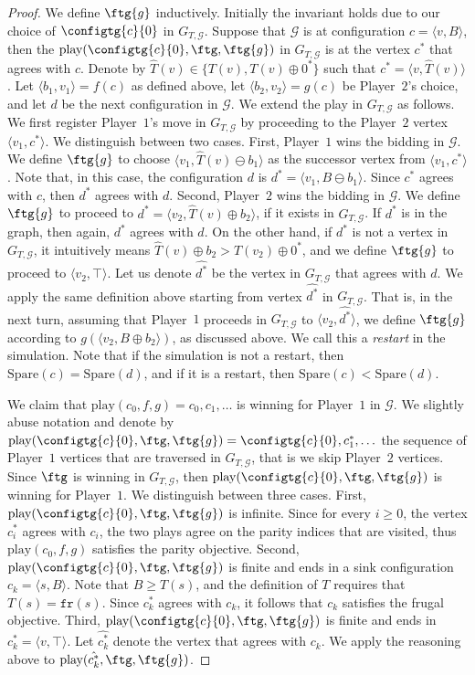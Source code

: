 \documentclass{article}\providecommand{\nequiv}{\not\equiv}\usepackage[a4paper,margin=20mm]{geometry}
\newcommand{\PO}{Player~$1$\xspace}
\newcommand{\PT}{Player~$2$\xspace}
\newcommand{\G}{{\mathcal G}}
\newcommand{\fr}{\texttt{fr}}
\newcommand{\play}{\text{play}\xspace}
\newcommand{\Spare}{\text{Spare}\xspace}
\newcommand{\zug}[1]{\langle #1  \rangle}
\newcommand{\succb}[1]{#1 \oplus 0^*\xspace}
\newcommand{\placeholdr}{\hat{T}(v)}
\begin{document}
\begin{proof}
	We define \(\ftg{g}\) inductively. 
Initially the invariant holds due to our choice of \(\configtg{c}{0}\) in \(G_{T, \G}\). 
	Suppose that \(\G\) is at configuration \(c = \zug{v, B}\), then the \(\play(\configtg{c}{0}, \ftg, \ftg{g})\) in  \(G_{T, \G}\) is at the vertex \(c^*\) that agrees with \(c\). 
	Denote by \(\placeholdr \in \{T(v), \succb{T(v)}\}\) such that \(c^* = \zug{v, \placeholdr}\). 
	Let \(\zug{b_1, v_1} = f(c)\) as defined above, let \(\zug{b_2, v_2} = g(c)\) be \PT's choice, and let \(d\) be the next configuration in $\G$. We extend the play in $G_{T,\G}$ as follows. 
	We first register \PO's move in \(G_{T, \G}\) by proceeding to the \PT vertex \(\zug{v_1, c^*}\). 
	We distinguish between two cases. First, \PO wins the bidding in $\G$. We define \(\ftg{g}\) to choose \(\zug{v_1, \placeholdr \ominus b_1}\) as the successor vertex from \(\zug{v_1, c^*}\). 
	Note that, in this case, the configuration \(d\) is \(d^* = \zug{v_1, B \ominus b_1}\).  
	Since \(c^*\) agrees with \(c\), then \(d^*\) agrees with \(d\). 
	Second, \PT wins the bidding in $\G$. We define \(\ftg{g}\) to proceed to \(d^* = \zug{v_2, \placeholdr \oplus b_2}\), if it exists in \(G_{T, \G}\). 
	If \(d^*\) is in the graph, then again, $d^*$ agrees with $d$. 
	On the other hand, if \(d^*\) is not a vertex in \(G_{T, \G}\), it intuitively means \(\placeholdr \oplus b_2 > \succb{T(v_2)}\), and we define \(\ftg{g}\) to proceed to \(\zug{v_2, \top}\). 
	Let us denote \(\hat{d^*}\) be the vertex in \(G_{T, \G}\) that agrees with \(d\). 
	We apply the same definition above starting from vertex \(\hat{d^*}\) in \(G_{T, \G}\). 
	That is, in the next turn, assuming that \PO proceeds in \(G_{T, \G}\) to \(\zug{v_2, \hat{d^*}}\), we define \(\ftg{g}\) according to \(g(\zug{v_2, B \oplus b_2})\), as discussed above. 
	We call this a \emph{restart} in the simulation. 
	Note that if the simulation is not a restart, then \(\Spare(c) = \Spare(d)\), and if it is a restart, then \(\Spare(c) < \Spare(d)\). 
	
	We claim that $\play(c_0, f, g) = c_0, c_1,\ldots$ is winning for \PO in $\G$. We slightly abuse notation and denote by $\play(\configtg{c}{0}, \ftg, \ftg{g}) = \configtg{c}{0}, c^*_1,\ldots$ the sequence of \PO vertices that are traversed in $G_{T, \G}$, that is we skip \PT vertices. 
	Since $\ftg$ is winning in $G_{T, \G}$, then $\play(\configtg{c}{0}, \ftg, \ftg{g})$ is winning for \PO. We distinguish between three cases. 
	First, $\play(\configtg{c}{0}, \ftg, \ftg{g})$ is infinite. Since for every $i \geq 0$, the vertex $c^*_i$ agrees with $c_i$, the two plays agree on the parity indices that are visited, thus $\play(c_0, f, g)$ satisfies the parity objective. 
	Second, $\play(\configtg{c}{0}, \ftg, \ftg{g})$ is finite and ends in a sink configuration $c_k = \zug{s, B}$. Note that $B \geq T(s)$, and the definition of $T$ requires that $T(s) = \fr(s)$. 
	Since $c^*_k$ agrees with $c_k$, it follows that $c_k$ satisfies the frugal objective. 
	Third, $\play(\configtg{c}{0}, \ftg, \ftg{g})$ is finite and ends in $c^*_k = \zug{v, \top}$. 
	Let $\hat{c^*_k}$ denote the vertex that agrees with $c_k$. 
	We apply the reasoning above to $\play(\hat{c^*_k}, \ftg, \ftg{g})$. 
	

\end{proof}
\end{document}
